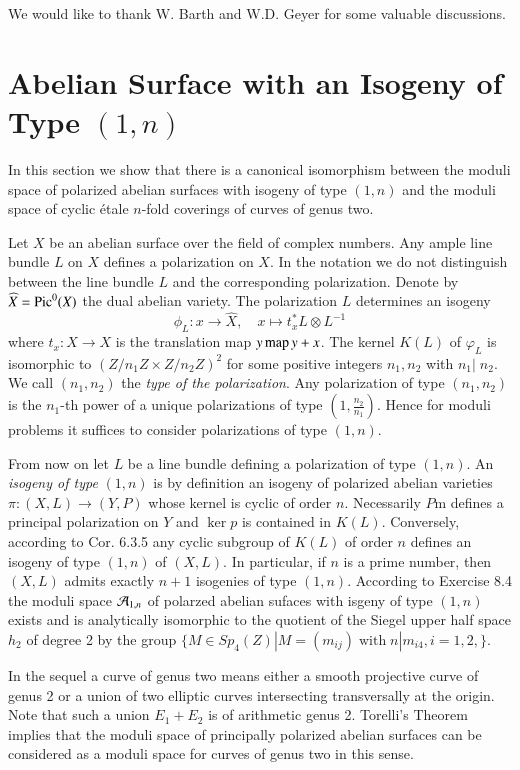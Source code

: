 We would like to thank W. Barth and W.D. Geyer for some valuable discussions.

\section{Abelian Surface with an Isogeny of Type $(1,n)$}\label{art11-sec-1}

In this section we show that there is a canonical isomorphism between the moduli space of polarized abelian surfaces with isogeny of type $(1,n)$ and the moduli space of cyclic \'etale $n$-fold coverings of curves of genus two.

Let $X$ be an abelian surface over the field of complex numbers. Any ample line bundle $L$ on $X$ defines a polarization on $X$. In the notation we do not distinguish between the line bundle $L$ and the corresponding polarization. Denote by $\widehat{X} = \operatorname{Pic}^{0}(X)$ the dual abelian variety. The polarization $L$ determines an isogeny
$$
\phi_{L}:x \rightarrow \widehat{X}, \quad x \mapsto t_{x}^{*}L \otimes L^{-1}
$$
where $t_{x}:X \rightarrow X$ is the translation map $y \operatorname{map} y +x$. The kernel $K(L)$ of $\varphi_{L}$ is isomorphic to $ (Z/n_{1} Z \times Z/n_{2}Z)^{2}$ for some positive integers $n_{1},n_{2}$ with $n_{1} |\; n_{2}$. We call $(n_{1}, n_{2})$ the \textit{type of the polarization}. Any polarization of type $(n_{1}, n_{2})$ is the $n_{1}$-th power of a unique polarizations of type $(1, \frac{n_{2}}{n_{1}})$. Hence for moduli problems it suffices to consider polarizations of type $(1,n)$.  

From now on let $L$ be a line bundle defining a polarization of type $(1,n)$. An \textit{isogeny of type} $(1,n)$ is by definition an isogeny of polarized abelian varieties $\pi : (X, L) \rightarrow (Y, P)$ whose kernel is cyclic of order $n$. Necessarily $P$m defines a principal polarization on $Y$ and $\ker p$ is contained in $K(L)$. Conversely, according to \cite{art11-keyL-B} Cor. 6.3.5 any cyclic subgroup of $K(L)$ of order $n$ defines an isogeny of type $(1,n)$ of $(X,L)$. In particular, if $n$ is a prime number, then $(X, L)$ admits exactly $n+1$ isogenies of type $(1,n)$. According to
\cite{art11-keyL-B} Exercise 8.4 the moduli space $\mathcal{A}_{1,n}$  of polarzed abelian sufaces with isgeny of type $(1,n)$ exists and is analytically isomorphic to the quotient of the Siegel upper half space $h_{2}$ of degree 2 by the group $\{ M \in Sp_{4}(Z) | M=(m_{ij})\; \text{with} \; n|m_{i4}, i=1,2,\}$.

In the sequel a curve of genus two means either a smooth projective curve of genus 2 or a union of two elliptic curves intersecting transversally at the origin. Note that such a union $E_{1}+ E_{2}$ is of arithmetic genus 2. Torelli's Theorem implies that the moduli space of principally polarized abelian surfaces can be considered as a moduli space for curves of genus two in this sense.

